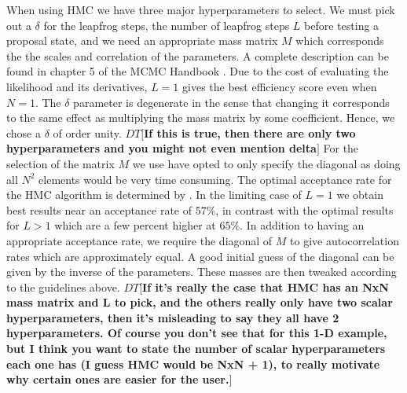 \documentclass{aa}
\def\memodt#1{\color{green}$DT[${\bf #1}$]$ \color{black}}
\begin{document}
When using HMC we have three major hyperparameters to select. 
We must pick out a $\delta$ for the leapfrog steps, the number of leapfrog steps $L$ before testing a proposal state, and we need an appropriate mass matrix $M$ which corresponds the the scales and correlation of the parameters. 
A complete description can be found in chapter 5 of the MCMC Handbook \cite{1206.1901}. 
Due to the cost of evaluating the likelihood and its derivatives, $L=1$ gives the best efficiency score even when $N=1$. 
The $\delta$ parameter is degenerate in the sense that changing it corresponds to the same effect as multiplying the mass matrix by some coefficient.
Hence, we chose a $\delta$ of order unity. \memodt{If this is true, then there are only two hyperparameters and you might not even mention delta}
For the selection of the matrix $M$ we use have opted to only specify the diagonal as doing all $N^2$ elements would be very time consuming.
The optimal acceptance rate for the HMC algorithm is determined by \cite{1001.4460}. 
In the limiting case of $L=1$ we obtain best results near an acceptance rate of $57\%$, in contrast with the optimal results for $L>1$ which are a few percent higher at $65\%$. 
In addition to having an appropriate acceptance rate, we require the diagonal of $M$ to give autocorrelation rates which are approximately equal.
A good initial guess of the diagonal can be given by the inverse of the parameters. 
These masses are then tweaked according to the guidelines above.
\memodt{If it's really the case that HMC has an NxN mass matrix and L to pick, and the others really only have two scalar hyperparameters, then it's misleading to say they all have 2 hyperparameters. Of course you don't see that for this 1-D example, but I think you want to state the number of scalar hyperparameters each one has (I guess HMC would be NxN + 1), to really motivate why certain ones are easier for the user.}
\end{document}
